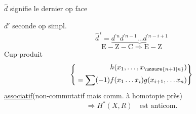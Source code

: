$\widehat d$ signifie le dernier op face

$d'$ seconde op simpl.
\[
\widehat d^{\,i}=\underbrace{d^{\prime n}d^{\prime n-1}\ldots d^{\prime n-i+1}}
\]
\[
\mathrm{E\!-\!Z\!-\!C}\Rightarrow\mathrm{E\!-\!Z}
\]
Cup-produit
\[
\left\{\begin{aligned}
h(x_1,\ldots,x_{\unsure{n+1|n}})\\
{}=\sum(-1)f(x_1\ldots x_i)g(x_{i+1},\ldots x_n)
\end{aligned}\right\}
\]
\uline{associatif}\quad(non-commutatif mais comm. à homotopie près)
\[
\Rightarrow H^*(X,R)\quad\text{est anticom.}
\]
